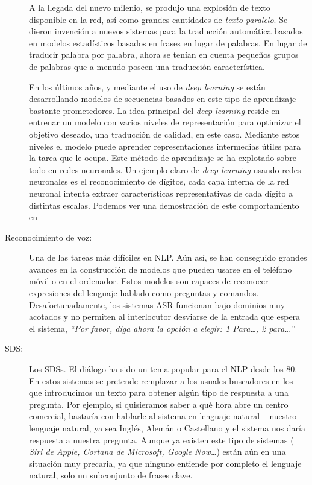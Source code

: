 \begin{description}
    A la llegada del nuevo milenio, se produjo una explosión de texto disponible
    en la red, así como grandes cantidades de \emph{texto paralelo}. Se dieron
    invención a nuevos sistemas para la traducción automática basados en modelos
    estadísticos basados en frases en lugar de palabras. En lugar de traducir
    palabra por palabra, ahora se tenían en cuenta pequeños grupos de palabras
    que a menudo poseen una traducción característica.

    En los últimos años, y mediante el uso de \emph{deep learning} se están
    desarrollando modelos de secuencias basados en este tipo de aprendizaje
    bastante prometedores. La idea principal del \emph{deep learning} reside en
    entrenar un modelo con varios niveles de representación para optimizar el
    objetivo deseado, una traducción de calidad, en este caso. Mediante estos
    niveles el modelo puede aprender representaciones intermedias útiles para la
    tarea que le ocupa. Este método de aprendizaje se ha explotado sobre todo en
    redes neuronales. Un ejemplo claro de \emph{deep learning} usando redes
    neuronales es el reconocimiento de dígitos, cada capa interna de la red
    neuronal intenta extraer características representativas de cada dígito a
    distintas escalas. Podemos ver una demostración de este comportamiento en
    \citet{computerPhile:nn}
  \item[Reconocimiento de voz:] Una de las tareas más difíciles en \ac{NLP}. Aún
    así, se han conseguido grandes avances en la construcción de modelos que
    pueden usarse en el teléfono móvil o en el ordenador. Estos modelos son
    capaces de reconocer expresiones del lenguaje hablado como preguntas y
    comandos. Desafortunadamente, los sistemas \ac{ASR}
    funcionan bajo dominios muy acotados y no permiten al interlocutor desviarse
    de la entrada que espera el sistema, \eg \emph{``Por favor, diga ahora la
      opción a elegir: 1 Para\dots, 2 para\dots''}
  \item[SDS:] Los \acp{SDS}. El diálogo ha sido un tema popular para el \ac{NLP} desde los
    80. En estos sistemas se pretende remplazar a los usuales buscadores en los
    que introducimos un texto para obtener algún tipo de respuesta a una
    pregunta. Por ejemplo, si quisieramos saber a qué hora abre un centro
    comercial, bastaría con hablarle al sistema en lenguaje natural -- nuestro
    lenguaje natural, ya sea Inglés, Alemán o Castellano y el sistema nos daría
    respuesta a nuestra pregunta. Aunque ya existen este tipo de sistemas (\eg
    \emph{Siri de Apple, Cortana de Microsoft, Google Now\dots}) están aún en
    una situación muy precaria, ya que ninguno entiende por completo el lenguaje
    natural, solo un subconjunto de frases clave.


\end{description}
